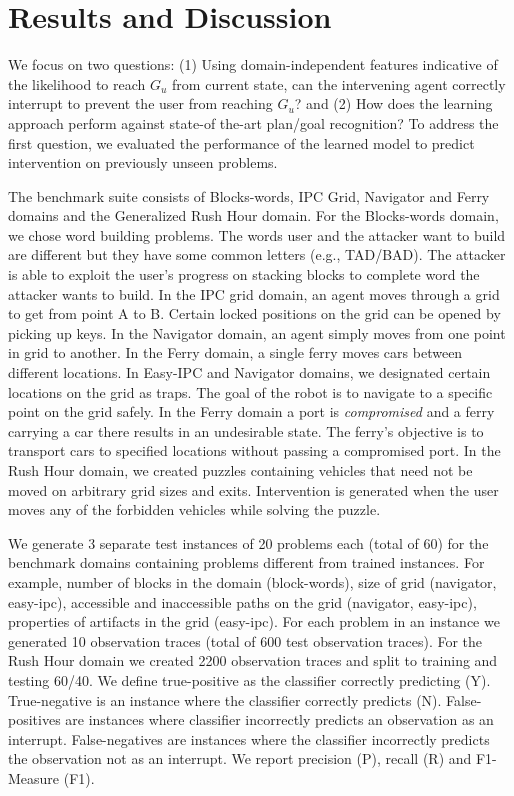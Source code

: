 \section{Results and Discussion}
We focus on two questions: (1) Using domain-independent features indicative of the likelihood to reach $G_u$ from current state, can the intervening agent correctly interrupt to prevent the user from reaching $G_u$? and (2) How does the learning approach perform against state-of the-art plan/goal recognition? To address the first question, we evaluated the performance of the learned model to predict intervention on previously unseen problems.

The benchmark suite consists of Blocks-words, IPC Grid, Navigator and Ferry domains and the Generalized Rush Hour domain. For the Blocks-words domain, we chose word building problems. The words user and the attacker want to build are different but they have some common letters (e.g., TAD/BAD). The attacker is able to exploit the user's progress on stacking blocks to complete word the attacker wants to build. In the IPC grid domain, an agent moves through a grid to get from point A to B. Certain locked positions on the grid can be opened by picking up keys. In the Navigator domain, an agent simply moves from one point in grid to another. In the Ferry domain, a single ferry moves cars between different locations. In Easy-IPC and Navigator domains, we designated certain locations on the grid as traps. The goal of the robot is to navigate to a specific point on the grid safely. In the Ferry domain a port is \emph{compromised} and a ferry carrying a car there results in an undesirable state. The ferry's objective is to transport cars to specified locations without passing a compromised port. In the Rush Hour domain, we created puzzles containing vehicles that need not be moved on arbitrary grid sizes and exits. Intervention is generated when the user moves any of the forbidden vehicles while solving the puzzle.

We generate 3 separate test instances of 20 problems each (total of 60) for the benchmark domains containing problems different from trained instances. For example, number of blocks in the domain (block-words), size of grid (navigator, easy-ipc), accessible and inaccessible paths on the grid (navigator, easy-ipc), properties of artifacts in the grid (easy-ipc). For each problem in an instance we generated 10 observation traces (total of 600 test observation traces). For the Rush Hour domain we created 2200 observation traces and split to training and testing 60/40. We define true-positive as the classifier correctly predicting (Y). True-negative is an instance where the classifier  correctly predicts (N). False-positives are instances where classifier incorrectly predicts an observation as an interrupt. False-negatives are instances where the classifier incorrectly predicts the observation not as an interrupt. We report precision (P), recall (R) and F1-Measure (F1).

